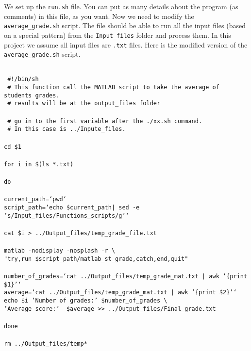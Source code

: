 \vspace{5mm}
\noindent
We set up the \texttt{run.sh} file. You can put as many details about the program (as comments) in this file, as you want. Now we need to modify the \texttt{average\_grade.sh} script. The file should be able to run all the input files (based on a special pattern) from the \texttt{Input\_files} folder and process them. In this project we assume all input files are \texttt{.txt} files. Here is the modified version of the \texttt{average\_grade.sh} script.
\vspace{5mm} 
\begin{mdframed}[hidealllines=true,backgroundcolor=gray!20]
\begin{singlespace}
\fontsize{10pt}{1pt}
\texttt{
\\
{ \color{matlab_green} \#!/bin/sh}\\
{ \color{matlab_green} \# This function call the MATLAB script to take the average of students grades.}\\
{ \color{matlab_green} \# results will be at the output\_files folder}\\
\\
{ \color{matlab_green} \# go in to the first variable after the ./xx.sh command.}\\
{ \color{matlab_green} \# In this case is ../Inpute\_files.}\\
\\
cd \$1\\
\\
{\color{for_pink}for} i {\color{for_pink}in} \$(ls *.txt)\\
\\
{\color{for_pink}do}\\
\\
current\_path={\color{red}`pwd`}\\
script\_path={\color{red}`echo \$current\_path| sed -e 's/Input\_files/Functions\_scripts/g'`}\\
\\
cat \$i > ../Output\_files/temp\_grade\_file.txt\\
\\
matlab -nodisplay -nosplash -r   \textbackslash \\
{\color{red}"try,run \$script\_path/matlab\_st\_grade,catch,end,quit"}\\
\\
number\_of\_grades={\color{red}`cat ../Output\_files/temp\_grade\_mat.txt | awk '\{print \$1\}'`}\\
average={\color{red}`cat ../Output\_files/temp\_grade\_mat.txt | awk '\{print \$2\}'`}\\
echo \$i {\color{red}'Number of grades:'}  \$number\_of\_grades \textbackslash \\
\phantom{x}\hspace{14ex} {\color{red}'Average score:'} \  \$average >> ../Output\_files/Final\_grade.txt \\
\\
{\color{for_pink}done}\\
\\
rm ../Output\_files/temp*  \\  
 }
\end{singlespace}
\end{mdframed}
